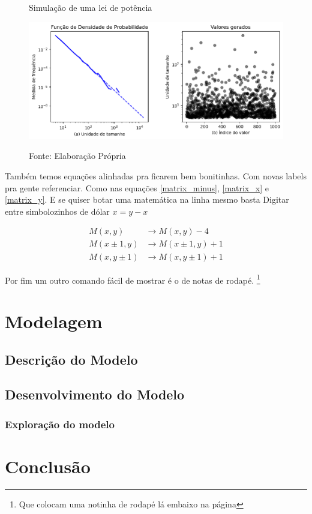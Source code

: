 \begin{figure}[h]
    \centering
    \caption{Simulação de uma lei de potência}
    \includegraphics[width=1\linewidth]{Imagens/duas.png}
    \label{fig:lei_potencias}
    \captionsetup{font=footnotesize}
    \vspace*{-7mm}
    \caption*{Fonte: Elaboração Própria}
\end{figure}


Também temos equações alinhadas pra ficarem bem bonitinhas. Com novas labels pra gente referenciar. Como nas equações \eqref{matrix_minus}, \eqref{matrix_x} e \eqref{matrix_y}. E se quiser botar uma matemática na linha mesmo basta Digitar entre simbolozinhos de dólar $x=y-x$

\begin{align} 
M(x,y) & \rightarrow  M(x,y) - 4 \label{matrix_minus}\\ 
M(x\pm 1,y) &\rightarrow  M(x\pm 1,y) + 1 \label{matrix_x}\\
M(x,y \pm 1) &\rightarrow  M(x, y\pm 1) + 1 \label{matrix_y}
\end{align}

Por fim um outro comando fácil de mostrar é o de notas de rodapé. \footnote{Que colocam uma notinha de rodapé lá embaixo na página}

\chapter{Modelagem} \label{modelagem}

\lipsum[5]
\section{Descrição do Modelo} \label{descrição}

\lipsum[5]

\section{Desenvolvimento do Modelo} \label{desenv}

\lipsum[10]

\subsection{Exploração do modelo}

\lipsum[10]

\chapter{Conclusão} \label{conclusao}

\lipsum[10]